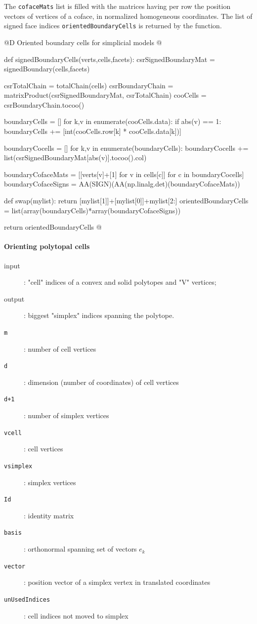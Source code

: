 \documentclass[11pt,oneside]{article}	%
\begin{document}
The \texttt{cofaceMats} list is filled 
with the matrices having per row the position vectors of vertices of a coface, in normalized 
homogeneous coordinates. The list of signed face indices \texttt{orientedBoundaryCells} is returned by the function.

@D Oriented boundary cells for simplicial models
@{def signedBoundaryCells(verts,cells,facets):
	csrSignedBoundaryMat = signedBoundary(cells,facets)

	csrTotalChain = totalChain(cells)
	csrBoundaryChain = matrixProduct(csrSignedBoundaryMat, csrTotalChain)
	cooCells = csrBoundaryChain.tocoo()
	
	boundaryCells = []
	for k,v in enumerate(cooCells.data):
		if abs(v) == 1:
			boundaryCells += [int(cooCells.row[k] * cooCells.data[k])]
			
	boundaryCocells = []
	for k,v in enumerate(boundaryCells):
		boundaryCocells += list(csrSignedBoundaryMat[abs(v)].tocoo().col)
		
	boundaryCofaceMats = [[verts[v]+[1] for v in cells[c]] for c in boundaryCocells]
	boundaryCofaceSigns = AA(SIGN)(AA(np.linalg.det)(boundaryCofaceMats))
	
	def swap(mylist): return [mylist[1]]+[mylist[0]]+mylist[2:]
	orientedBoundaryCells = list(array(boundaryCells)*array(boundaryCofaceSigns))
	
	return orientedBoundaryCells
@}

\paragraph{Orienting polytopal cells}
\begin{description}
	\item[input]:  "cell" indices of a convex and solid polytopes and "V" vertices;
	\item[output]:  biggest "simplex" indices spanning the polytope.
	\item[\tt m]: number of cell vertices
	\item[\tt d]: dimension (number of coordinates) of cell vertices
	\item[\tt d+1]: number of simplex vertices
	\item[\tt vcell]: cell vertices
	\item[\tt vsimplex]: simplex vertices
	\item[\tt Id]: identity matrix
	\item[\tt basis]: orthonormal spanning set of vectors $e_k$
	\item[\tt vector]: position vector of a simplex vertex in translated coordinates
	\item[\tt unUsedIndices]: cell indices not moved to simplex
\end{description}
\end{document}
